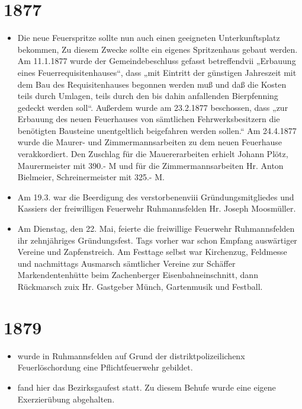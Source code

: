 \documentclass[12pt,a4paper]{book}
\begin{document}
\section*{1877}

\begin{itemize}
\item Die neue Feuerspritze sollte nun auch einen geeigneten Unterkunftsplatz
bekommen, Zu diesem Zwecke sollte ein eigenes Spritzenhaus gebaut werden. Am
11.1.1877 wurde der Gemeindebeschluss gefasst betreffendvii „Erbauung eines
Feuerrequisitenhauses“, dass „mit Eintritt der günstigen Jahreszeit mit dem Bau
des Requisitenhauses begonnen werden muß und daß die Kosten teils durch Umlagen,
teils durch den bis dahin anfallenden Bierpfenning gedeckt werden soll“.
Außerdem wurde am 23.2.1877 beschossen, dass „zur Erbauung des neuen Feuerhauses
von sämtlichen Fehrwerksbesitzern die benötigten Bausteine unentgeltlich
beigefahren werden sollen.“ Am 24.4.1877 wurde die Maurer- und
Zimmermannsarbeiten zu dem neuen Feuerhause verakkordiert. Den Zuschlag für die
Mauererarbeiten erhielt Johann Plötz, Maurermeister mit 390.- M und für die
Zimmermannsarbeiten Hr. Anton Bielmeier, Schreinermeister mit 325.- M.

\item Am 19.3. war die Beerdigung des verstorbenenviii Gründungsmitgliedes und
Kassiers der freiwilligen Feuerwehr Ruhmannsfelden Hr. Joseph Moosmüller.

\item Am Dienstag, den 22. Mai, feierte die freiwillige Feuerwehr Ruhmannsfelden
ihr zehnjähriges Gründungsfest. Tags vorher war schon Empfang auswärtiger
Vereine und Zapfenstreich. Am Festtage selbst war Kirchenzug, Feldmesse und
nachmittags Ausmarsch sämtlicher Vereine zur Schäffer Markendentenhütte beim
Zachenberger Eisenbahneinschnitt, dann Rückmarsch zuix Hr. Gastgeber Münch,
Gartenmusik und Festball.
\end{itemize}

\section*{1879}

\begin{itemize}
\item wurde in Ruhmannsfelden auf Grund der distriktpolizeilichenx
Feuerlöschordung eine Pflichtfeuerwehr gebildet.

\item fand hier das Bezirksgaufest statt. Zu diesem Behufe wurde eine eigene
Exerzierübung abgehalten.
\end{itemize}
\end{document}

